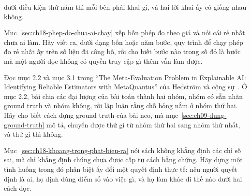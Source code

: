 \begin{cauhoids}
dưới điều kiện thứ năm thì mỗi bên phải khai gì, và hai lời khai ấy có giống nhau
không.
  \item Mục~\ref{sec:ch18-phep-do-chua-ai-chay} xếp bốn phép đo theo giá và nói
cái rẻ nhất chưa ai làm. Hãy viết ra, dưới dạng bốn hoặc năm bước, quy trình để
chạy phép đo rẻ nhất ấy trên số liệu đã công bố, rồi cho biết bước nào trong số
đó là bước mà một người đọc không có quyền truy cập gì thêm vẫn làm được.
  \item Đọc mục 2.2 và mục 3.1 trong \enquote{The Meta-Evaluation Problem in
Explainable AI: Identifying Reliable Estimators with MetaQuantus} của Hedström và
cộng sự~\autocite{mmetaquantus}. Ở mục 2.2, bài chia các đại lượng của bài toán
thành hai nhóm, nhóm có sẵn nhãn ground truth và nhóm không, rồi lập luận rằng
chỗ hỏng nằm ở nhóm thứ hai. Hãy cho biết cách dựng ground truth của bài neo, mà
mục~\ref{sec:ch09-dung-ground-truth} mô tả, chuyển được thứ gì từ nhóm thứ hai
sang nhóm thứ nhất, và thứ gì thì không.
  \item Mục~\ref{sec:ch18-khoang-trong-phat-bieu-ra} nói sách không khẳng định
các chỉ số sai, mà chỉ khẳng định chúng chưa được cấp tư cách bằng chứng. Hãy
dựng một tình huống trong đó phân biệt ấy đổi một quyết định thực tế: nêu người
quyết định là ai, họ định dùng điểm số vào việc gì, và họ làm khác đi thế nào
dưới hai cách đọc.
\end{cauhoids}
